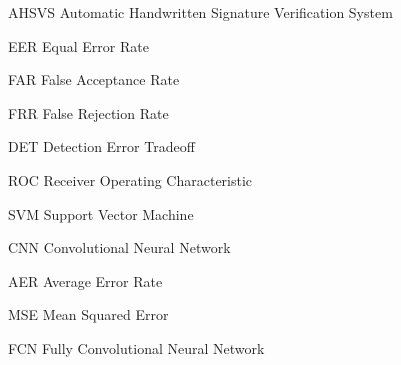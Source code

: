 \begin{siglas}
	
\item[AHSVS] Automatic Handwritten Signature Verification System
\item[EER] Equal Error Rate
\item[FAR] False Acceptance Rate
\item[FRR] False Rejection Rate
\item[DET] Detection Error Tradeoff
\item[ROC] Receiver Operating Characteristic
\item[SVM] Support Vector Machine
\item[CNN] Convolutional Neural Network
\item[AER] Average Error Rate
\item[MSE] Mean Squared Error
\item[FCN] Fully Convolutional Neural Network
\end{siglas}
